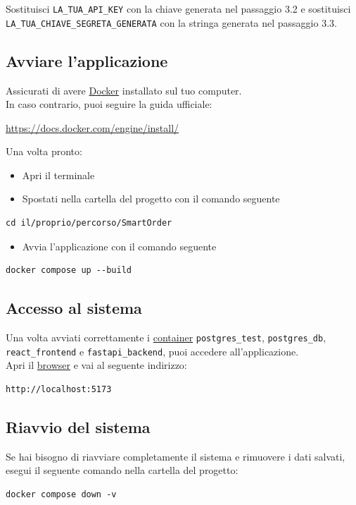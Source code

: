 Sostituisci \texttt{LA\_TUA\_API\_KEY} con la chiave generata nel passaggio 3.2 e sostituisci \texttt{LA\_TUA\_CHIAVE\_SEGRETA\_GENERATA} con la stringa generata nel passaggio 3.3.

\subsection{Avviare l'applicazione}

Assicurati di avere \hyperlink{glossario:docker}{Docker} installato sul tuo computer.\\
In caso contrario, puoi seguire la guida ufficiale:

\begin{center}
	\url{https://docs.docker.com/engine/install/}
\end{center}

Una volta pronto:

\begin{itemize}[itemsep=5pt, parsep=5pt, label=$\scriptstyle\bullet$]
	\item Apri il terminale
	\item Spostati nella cartella del progetto con il comando seguente
\end{itemize}

\begin{lstlisting}[style=pseudocodice]
cd il/proprio/percorso/SmartOrder
\end{lstlisting}

\begin{itemize}[itemsep=5pt, parsep=5pt, label=$\scriptstyle\bullet$]
	\item Avvia l'applicazione con il comando seguente
\end{itemize}

\begin{lstlisting}[style=pseudocodice]
docker compose up --build
\end{lstlisting}

\subsection{Accesso al sistema}

Una volta avviati correttamente i \hyperlink{glossario:container}{container} \texttt{postgres\_test}, \texttt{postgres\_db}, \texttt{react\_frontend} e \texttt{fastapi\_backend}, puoi accedere all'applicazione.\\
Apri il \hyperlink{glossario:browser}{browser} e vai al seguente indirizzo:

\begin{lstlisting}[style=pseudocodice]
http://localhost:5173
\end{lstlisting}

\subsection{Riavvio del sistema}

Se hai bisogno di riavviare completamente il sistema e rimuovere i dati salvati, esegui il seguente comando nella cartella del progetto:

\begin{lstlisting}[style=pseudocodice]
docker compose down -v
\end{lstlisting}
